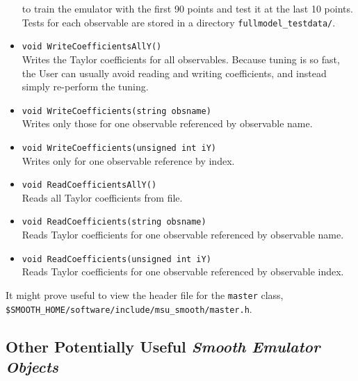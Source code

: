 \documentclass[UserManual.tex]{subfiles}
\begin{document}
\begin{sloppypar}
\begin{itemize}
\vspace*{-8pt}{\tt \begin{Verbatim}[commandchars=\\\{\}]
SmoothEmulator_TrainingPts 0-89
SmoothEmulator_TestingPts 90-99
\end{Verbatim}
}\vspace*{-8pt}
to train the emulator with the first 90 points and test it at the last 10 points. Tests for each observable are stored in a directory {\tt fullmodel\_testdata/}.

\item {\tt void WriteCoefficientsAllY()}\\
Writes the Taylor coefficients for all observables. Because tuning is so fast, the User can usually avoid reading and writing coefficients, and instead simply re-perform the tuning. 
\item {\tt void WriteCoefficients(string obsname)}\\
Writes only those for one observable referenced by observable name.
\item {\tt void WriteCoefficients(unsigned int iY)}\\
Writes only for one observable reference by index.
\item {\tt void ReadCoefficientsAllY()}\\
Reads all Taylor coefficients from file.
\item {\tt void ReadCoefficients(string obsname)}\\
Reads Taylor coefficients for one observable referenced by observable name.
\item {\tt void ReadCoefficients(unsigned int iY)}\\
Reads Taylor coefficients for one observable referenced by observable index.
\end{itemize}
It might prove useful to view the header file for the {\tt master} class, {\tt \${SMOOTH\_HOME}/software/include/msu\_smooth/master.h}.

\subsection{Other Potentially Useful {\it Smooth Emulator Objects}}


\end{sloppypar}
\end{document}
